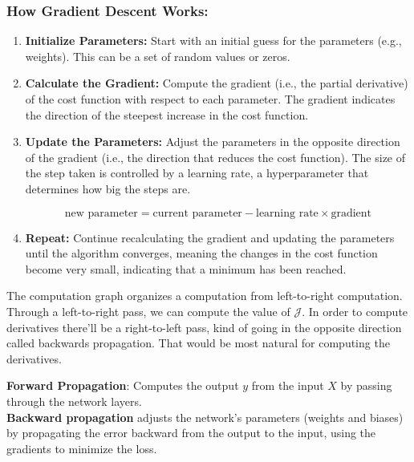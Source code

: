 \documentclass[letterpaper,12pt,notitlepage,twoside]{report}
\begin{document}
\subsubsection*{How Gradient Descent Works:}
\begin{enumerate}
    \item \textbf{Initialize Parameters:} Start with an initial guess for the parameters (e.g., weights). This can be a set of random values or zeros.
    
    \item \textbf{Calculate the Gradient:} Compute the gradient (i.e., the partial derivative) of the cost function with respect to each parameter. The gradient indicates the direction of the steepest increase in the cost function.
    
    \item \textbf{Update the Parameters:} Adjust the parameters in the opposite direction of the gradient (i.e., the direction that reduces the cost function). The size of the step taken is controlled by a learning rate, a hyperparameter that determines how big the steps are.
    
    \[
    \text{new parameter} = \text{current parameter} - \text{learning rate} \times \text{gradient}
    \]
    
    \item \textbf{Repeat:} Continue recalculating the gradient and updating the parameters until the algorithm converges, meaning the changes in the cost function become very small, indicating that a minimum has been reached.
\end{enumerate}

\begin{funfact}[frametitle=\facttitlep{FunFact}{Computation Graph}]
The computation graph organizes a computation from left-to-right computation. Through a left-to-right pass, we can compute the value of $\mathcal{J}$. In order to compute derivatives there'll be a right-to-left pass, kind of going in the opposite direction called backwards propagation. That would be most natural for computing the derivatives. 
\end{funfact}

\textbf{Forward Propagation}: Computes the output $y$ from the input $X$ by passing through the network layers. \\
\textbf{Backward propagation} adjusts the network's parameters (weights and biases) by propagating the error backward from the output to the input, using the gradients to minimize the loss.
\end{document}
